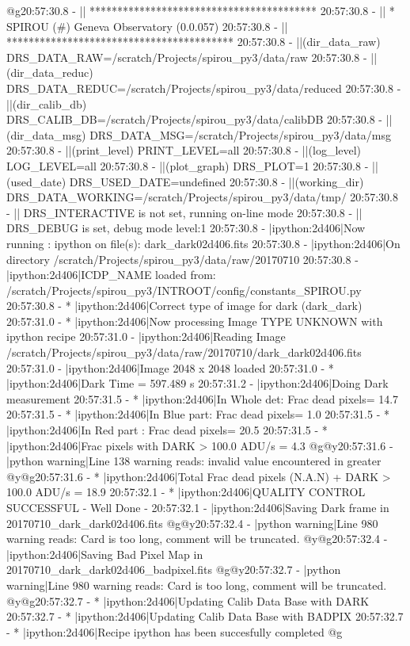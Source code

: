 \begin{cmdboxprintspecial}
@g20:57:30.8 -   || ***************************************** 
20:57:30.8 -   || * SPIROU \@(#) Geneva Observatory (0.0.057) 
20:57:30.8 -   || ***************************************** 
20:57:30.8 -   ||(dir_data_raw)      DRS_DATA_RAW=/scratch/Projects/spirou_py3/data/raw 
20:57:30.8 -   ||(dir_data_reduc)    DRS_DATA_REDUC=/scratch/Projects/spirou_py3/data/reduced 
20:57:30.8 -   ||(dir_calib_db)      DRS_CALIB_DB=/scratch/Projects/spirou_py3/data/calibDB 
20:57:30.8 -   ||(dir_data_msg)      DRS_DATA_MSG=/scratch/Projects/spirou_py3/data/msg 
20:57:30.8 -   ||(print_level)       PRINT_LEVEL=all         %
20:57:30.8 -   ||(log_level)         LOG_LEVEL=all         %
20:57:30.8 -   ||(plot_graph)        DRS_PLOT=1            %
20:57:30.8 -   ||(used_date)         DRS_USED_DATE=undefined
20:57:30.8 -   ||(working_dir)       DRS_DATA_WORKING=/scratch/Projects/spirou_py3/data/tmp/
20:57:30.8 -   ||                    DRS_INTERACTIVE is not set, running on-line mode
20:57:30.8 -   ||                    DRS_DEBUG is set, debug mode level:1
20:57:30.8 -   |ipython:2d406|Now running : ipython on file(s): dark_dark02d406.fits
20:57:30.8 -   |ipython:2d406|On directory /scratch/Projects/spirou_py3/data/raw/20170710
20:57:30.8 -   |ipython:2d406|ICDP_NAME loaded from: /scratch/Projects/spirou_py3/INTROOT/config/constants_SPIROU.py
20:57:30.8 - * |ipython:2d406|Correct type of image for dark (dark_dark)
20:57:31.0 - * |ipython:2d406|Now processing Image TYPE UNKNOWN with ipython recipe
20:57:31.0 -   |ipython:2d406|Reading Image /scratch/Projects/spirou_py3/data/raw/20170710/dark_dark02d406.fits
20:57:31.0 -   |ipython:2d406|Image 2048 x 2048 loaded
20:57:31.0 - * |ipython:2d406|Dark Time = 597.489 s
20:57:31.2 -   |ipython:2d406|Doing Dark measurement
20:57:31.5 - * |ipython:2d406|In Whole det: Frac dead pixels= 14.7 %
20:57:31.5 - * |ipython:2d406|In Blue part: Frac dead pixels= 1.0 %
20:57:31.5 - * |ipython:2d406|In Red part : Frac dead pixels= 20.5 %
20:57:31.5 - * |ipython:2d406|Frac pixels with DARK > 100.0 ADU/s = 4.3 %
@g@y20:57:31.6 - \@ |python warning|Line 138 warning reads: invalid value encountered in greater
@y@g20:57:31.6 - * |ipython:2d406|Total Frac dead pixels (N.A.N) + DARK > 100.0 ADU/s = 18.9 %
20:57:32.1 - * |ipython:2d406|QUALITY CONTROL SUCCESSFUL - Well Done -
20:57:32.1 -   |ipython:2d406|Saving Dark frame in 20170710_dark_dark02d406.fits
@g@y20:57:32.4 - \@ |python warning|Line 980 warning reads: Card is too long, comment will be truncated.
@y@g20:57:32.4 -   |ipython:2d406|Saving Bad Pixel Map in 20170710_dark_dark02d406_badpixel.fits
@g@y20:57:32.7 - \@ |python warning|Line 980 warning reads: Card is too long, comment will be truncated.
@y@g20:57:32.7 - * |ipython:2d406|Updating Calib Data Base with DARK
20:57:32.7 - * |ipython:2d406|Updating Calib Data Base with BADPIX
20:57:32.7 - * |ipython:2d406|Recipe ipython has been succesfully completed
@g
\end{cmdboxprintspecial}


